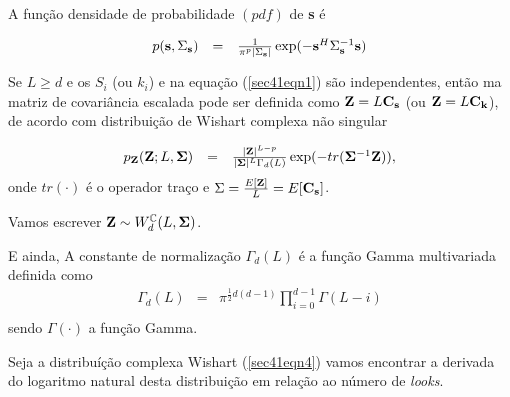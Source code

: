 \documentclass[12pt,a4paper]{article}
\begin{document}
A função densidade de probabilidade $(pdf)$ de {\bf s} é 

\begin{equation}\label{sec41eqn3}
\begin{array}{ccc}
	p({\bf s},\Sigma_{\bf s})&=&\frac{1}{\pi^p|\Sigma_{{\bf s}}|}\exp(-{\bf s}^{H}\Sigma_{{\bf s}}^{-1}{\bf s})  \\
\end{array}
\end{equation}

Se $L\geq d$ e os {\bf $S_i$} (ou {\bf $k_i$}) e na equação (\ref{sec41eqn1}) são independentes, então ma matriz de covariância escalada pode ser definida como ${\bf Z}=L{\bf C_{\bf s}}$ (ou ${\bf Z}=L{\bf C_{\bf k}}$), de acordo com distribuição de Wishart complexa não singular \cite{goodman1963}

\begin{equation}\label{sec41eqn4}
\begin{array}{ccc}
	p_{{\bf Z}}({\bf Z};L,{\bf \Sigma})&=&\frac{|{\bf Z}|^{L-p}}{|{\bf \Sigma}|^{L}\Gamma_d(L)} \exp(-tr({\bf \Sigma}^{-1}{\bf Z})), \\
\end{array}
\end{equation}
onde $tr(\cdot)$ é o operador traço e ${\Sigma}=\frac{E[{\bf Z}]}{L}=E[{\bf C_{s}}]$. 

Vamos escrever ${\bf Z}\sim W_d^{\mathbb C}(L, {\bf \Sigma})$.

E ainda, A constante de normalização $\Gamma_d(L)$ é a função Gamma multivariada definida como 
\begin{equation}\label{sec41eqn5}
\begin{array}{ccc}
	\Gamma_d(L)&=&\pi^{\frac{1}{2}d(d-1)} \displaystyle{\prod_{i=0}^{d-1}\Gamma(L-i)} \\
\end{array}
\end{equation}
sendo $\Gamma(\cdot)$ a função Gamma.

Seja a distribuíção complexa Wishart (\ref{sec41eqn4}) vamos encontrar a derivada do logaritmo natural desta distribuição em relação ao número de {\it looks}.
\end{document}
